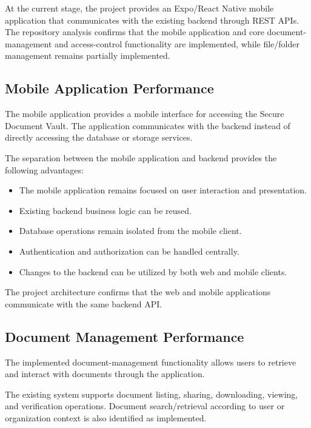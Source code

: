 \documentclass[12pt]{article}
\begin{document}
At the current stage, the project provides an Expo/React Native mobile application that communicates with the existing backend through REST APIs. The repository analysis confirms that the mobile application and core document-management and access-control functionality are implemented, while file/folder management remains partially implemented.


\subsection{Mobile Application Performance}

The mobile application provides a mobile interface for accessing the Secure Document Vault. The application communicates with the backend instead of directly accessing the database or storage services.

The separation between the mobile application and backend provides the following advantages:

\begin{itemize}
    \item The mobile application remains focused on user interaction and presentation.
    \item Existing backend business logic can be reused.
    \item Database operations remain isolated from the mobile client.
    \item Authentication and authorization can be handled centrally.
    \item Changes to the backend can be utilized by both web and mobile clients.
\end{itemize}

The project architecture confirms that the web and mobile applications communicate with the same backend API.


\subsection{Document Management Performance}

The implemented document-management functionality allows users to retrieve and interact with documents through the application.

The existing system supports document listing, sharing, downloading, viewing, and verification operations. Document search/retrieval according to user or organization context is also identified as implemented.
\end{document}
